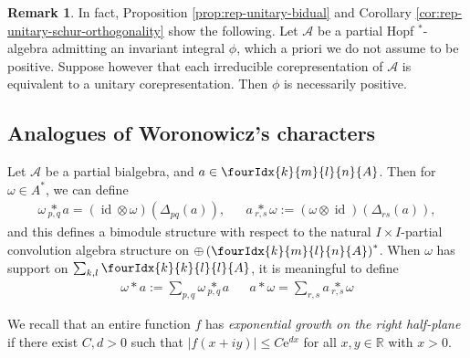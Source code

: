 \documentclass[10pt]{article}
\DeclareMathOperator{\id}{id}
\newcommand{\R}{\mathbb{R}}
\newcommand{\Gr}[5]{\fourIdx{#2}{#4}{#3}{#5}{#1}}%
\newcommand{\aste}[1]{\underset{#1}{\ast}}
\theoremstyle{definition}
\newtheorem{Rem}[Theorem]{Remark}
\numberwithin{equation}{section}
\begin{document}
\begin{Rem}\label{RemPos} In fact, Proposition \ref{prop:rep-unitary-bidual} and Corollary \ref{cor:rep-unitary-schur-orthogonality} show the following. Let $\mathscr{A}$ be a partial Hopf $^*$-algebra admitting an invariant integral $\phi$, which a priori we do not assume to be positive. Suppose however that each irreducible corepresentation of $\mathscr{A}$ is equivalent to a unitary corepresentation. Then $\phi$ is necessarily positive.
\end{Rem} 

\subsection{Analogues of Woronowicz's  characters}

Let $\mathscr{A}$ be a partial bialgebra, and $a\in \Gr{A}{k}{l}{m}{n}$. Then for $\omega \in A^*$, we can define
\begin{align*} \omega \aste{p,q} a = (\id \otimes \omega) (\Delta_{pq}(a)),&&a \aste{r,s}
\omega:=(\omega \otimes \id)(\Delta_{rs}(a)),\end{align*}and this defines a bimodule structure with respect to the natural $I\times I$-partial convolution algebra structure on $\oplus \left(\Gr{A}{k}{l}{m}{n}\right)^*$. When $\omega$ has support on $\sum_{k,l}\Gr{A}{k}{l}{k}{l}$, it is meaningful to define \begin{align*} \omega\ast a := \sum_{p,q} \omega\aste{p,q}a && a\ast \omega = \sum_{r,s} a\aste{r,s}\omega \end{align*}

We recall that an entire function $f$ has \emph{exponential growth
  on the right half-plane} if there exist $C,d>0$ such that $|f(x+iy)|\leq
C\mathrm{e}^{dx}$  for all $x,y\in \R$ with $x>0$. 
\end{document}
